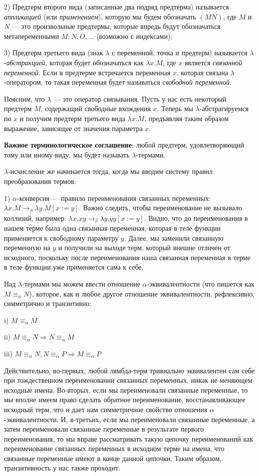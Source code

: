 \documentclass[a4paper]{article}
\begin{document}
2) Предтерм второго вида (записанные два подряд предтерма) называется \emph{аппликацией} (или \emph{применением}), которую мы будем обозначать $(M N)$, где
$M$ и $N$ --- это произвольные предтермы, которые впредь будут обозначаться метапеременными $M, N, O,...$ (возможно с индексами);

3) Предтерм третьего вида (знак $\lambda$ с переменной, точка и предтерм) называется $\lambda$-\emph{абстракцией}, которая будет обозначаться как $\lambda x.M$,
где $x$ является \emph{связанной переменной}. Если в предтерме встречается переменная $x$, которая связана $\lambda$-оператором,
то такая переменная будет называться \emph{свободной переменной}.

Поясним, что $\lambda$ --- это оператор связывания. Пусть у нас есть некоторый предтерм $M$, содержащий свободные вхождения $x$. Теперь мы $\lambda$-абстрагируемся
по $x$ и получим предтерм третьего вида $\lambda x. M$, предъявляя таким образом выражение, зависящее от значения параметра $x$.

\textbf{Важное терминологическое соглашение}: любой предтерм, удовлетворяющий тому или иному виду, мы будет называть $\lambda$-термами.

$\lambda$-исчисление же начинается тогда, когда мы вводим систему правил преобразования термов:

1) $\alpha$-конверсия --- правило переименования связанных переменных: $\lambda x.M \rightarrow_{\beta} \lambda y.M[x := y]$.
Важно следить, чтобы переименование не вызывало коллизий, например: $\lambda x. xy \rightarrow_{\beta} \lambda y.yy[x := y]$. Видно,
что до переименования в нашем терме была одна связанная переменная, которая в теле функции применяется к свободному параметру $y$.
Далее, мы заменили связанную переменную на $y$ и получили на выходе терм, который внешне отличен от исходного, поскольку после переименования
наша связанная переменная в терме в теле функции уже применяется сама к себе.

Над $\lambda$-термами мы можем ввести отношение $\alpha$-эквивалентности (что пишется как $M \equiv_{\alpha} N$), которое, как и любое другое отношение эквивалентности,
рефлексивно, симметрично и транзитивно:

i) $M \equiv_{\alpha} M$

ii) $M \equiv_{\alpha} N \Rightarrow N \equiv_{\alpha} M$

iii) $M \equiv_{\alpha} N, N \equiv_{\alpha} P \Rightarrow M \equiv_{\alpha} P$

Действительно, во-первых, любой лямбда-терм тривиально эквивалентен сам себе при
тождественном переименовании связанных переменных, никак не меняющем исходные имена. Во-вторых, если мы переименовали связанные переменные,
то мы вполне имеем право сделать обратное переименование, восстанавливающее исходный терм, что и дает нам симметричное свойство
отношения $\alpha$-эквивалентности. И, в-третьих, если мы переименовали связанные переменные, а затем переименовали связанные
переменные в результате первого переименования, то мы вправе рассматривать такую цепочку переименований как переименование связанных переменных в
исходном терме на имена, что связанные переменные имеют в конце данной цепочки. Таким образом, транзитивность у нас также проходит.
\end{document}
